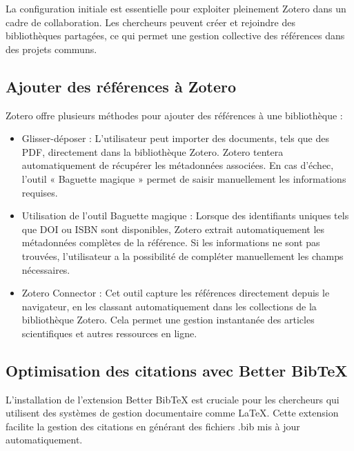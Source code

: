 \documentclass[
  letterpaper,
  DIV=11,
  numbers=noendperiod]{scrreprt}
\begin{document}
La configuration initiale est essentielle pour exploiter pleinement
Zotero dans un cadre de collaboration. Les chercheurs peuvent créer et
rejoindre des bibliothèques partagées, ce qui permet une gestion
collective des références dans des projets communs.

\hypertarget{ajouter-des-ruxe9fuxe9rences-uxe0-zotero}{%
\subsection{Ajouter des références à
Zotero}\label{ajouter-des-ruxe9fuxe9rences-uxe0-zotero}}

Zotero offre plusieurs méthodes pour ajouter des références à une
bibliothèque :

\begin{itemize}
\item
  Glisser-déposer : L'utilisateur peut importer des documents, tels que
  des PDF, directement dans la bibliothèque Zotero. Zotero tentera
  automatiquement de récupérer les métadonnées associées. En cas
  d'échec, l'outil « Baguette magique » permet de saisir manuellement
  les informations requises.
\item
  Utilisation de l'outil Baguette magique : Lorsque des identifiants
  uniques tels que DOI ou ISBN sont disponibles, Zotero extrait
  automatiquement les métadonnées complètes de la référence. Si les
  informations ne sont pas trouvées, l'utilisateur a la possibilité de
  compléter manuellement les champs nécessaires.
\item
  Zotero Connector : Cet outil capture les références directement depuis
  le navigateur, en les classant automatiquement dans les collections de
  la bibliothèque Zotero. Cela permet une gestion instantanée des
  articles scientifiques et autres ressources en ligne.
\end{itemize}

\hypertarget{optimisation-des-citations-avec-better-bibtex}{%
\subsection{Optimisation des citations avec Better
BibTeX}\label{optimisation-des-citations-avec-better-bibtex}}

L'installation de l'extension Better BibTeX est cruciale pour les
chercheurs qui utilisent des systèmes de gestion documentaire comme
LaTeX. Cette extension facilite la gestion des citations en générant des
fichiers .bib mis à jour automatiquement.
\end{document}
